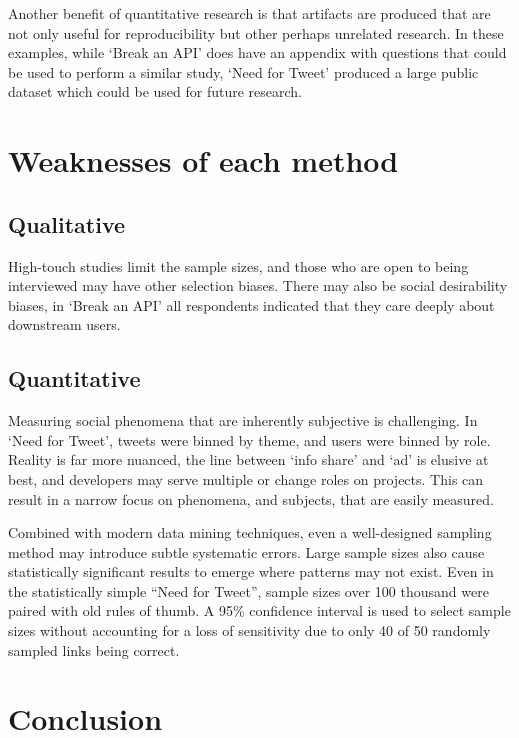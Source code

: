 \documentclass[conference]{IEEEtran}
\begin{document}
Another benefit of quantitative research is that artifacts are produced that are not only useful for reproducibility but other perhaps unrelated research. In these examples, while `Break an API' does have an appendix with questions that could be used to perform a similar study, `Need for Tweet' produced a large public dataset which could be used for future research.

\section{Weaknesses of each method}

\subsection{Qualitative}

High-touch studies limit the sample sizes, and those who are open to being interviewed may have other selection biases. There may also be social desirability biases, in `Break an API' all respondents indicated that they care deeply about downstream users.

\subsection{Quantitative}

Measuring social phenomena that are inherently subjective is challenging. In `Need for Tweet', tweets were binned by theme, and users were binned by role. Reality is far more nuanced, the line between `info share' and `ad' is elusive at best, and developers may serve multiple or change roles on projects. This can result in a narrow focus on phenomena, and subjects, that are easily measured.

Combined with modern data mining techniques, even a well-designed sampling method may introduce subtle systematic errors. Large sample sizes also cause statistically significant results to emerge where patterns may not exist. Even in the statistically simple ``Need for Tweet'', sample sizes over 100 thousand were paired with old rules of thumb. A 95\% confidence interval is used to select sample sizes without accounting for a loss of sensitivity due to only 40 of 50 randomly sampled links being correct. %

\section{Conclusion}
\end{document}
